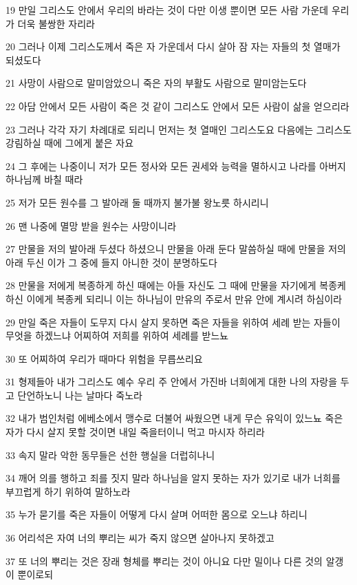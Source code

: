 \par 19 만일 그리스도 안에서 우리의 바라는 것이 다만 이생 뿐이면 모든 사람 가운데 우리가 더욱 불쌍한 자리라
\par 20 그러나 이제 그리스도께서 죽은 자 가운데서 다시 살아 잠 자는 자들의 첫 열매가 되셨도다
\par 21 사망이 사람으로 말미암았으니 죽은 자의 부활도 사람으로 말미암는도다
\par 22 아담 안에서 모든 사람이 죽은 것 같이 그리스도 안에서 모든 사람이 삶을 얻으리라
\par 23 그러나 각각 자기 차례대로 되리니 먼저는 첫 열매인 그리스도요 다음에는 그리스도 강림하실 때에 그에게 붙은 자요
\par 24 그 후에는 나중이니 저가 모든 정사와 모든 권세와 능력을 멸하시고 나라를 아버지 하나님께 바칠 때라
\par 25 저가 모든 원수를 그 발아래 둘 때까지 불가불 왕노릇 하시리니
\par 26 맨 나중에 멸망 받을 원수는 사망이니라
\par 27 만물을 저의 발아래 두셨다 하셨으니 만물을 아래 둔다 말씀하실 때에 만물을 저의 아래 두신 이가 그 중에 들지 아니한 것이 분명하도다
\par 28 만물을 저에게 복종하게 하신 때에는 아들 자신도 그 때에 만물을 자기에게 복종케 하신 이에게 복종케 되리니 이는 하나님이 만유의 주로서 만유 안에 계시려 하심이라
\par 29 만일 죽은 자들이 도무지 다시 살지 못하면 죽은 자들을 위하여 세례 받는 자들이 무엇을 하겠느냐 어찌하여 저희를 위하여 세례를 받느뇨
\par 30 또 어찌하여 우리가 때마다 위험을 무릅쓰리요
\par 31 형제들아 내가 그리스도 예수 우리 주 안에서 가진바 너희에게 대한 나의 자랑을 두고 단언하노니 나는 날마다 죽노라
\par 32 내가 범인처럼 에베소에서 맹수로 더불어 싸웠으면 내게 무슨 유익이 있느뇨 죽은 자가 다시 살지 못할 것이면 내일 죽을터이니 먹고 마시자 하리라
\par 33 속지 말라 악한 동무들은 선한 행실을 더럽히나니
\par 34 깨어 의를 행하고 죄를 짓지 말라 하나님을 알지 못하는 자가 있기로 내가 너희를 부끄럽게 하기 위하여 말하노라
\par 35 누가 묻기를 죽은 자들이 어떻게 다시 살며 어떠한 몸으로 오느냐 하리니
\par 36 어리석은 자여 너의 뿌리는 씨가 죽지 않으면 살아나지 못하겠고
\par 37 또 너의 뿌리는 것은 장래 형체를 뿌리는 것이 아니요 다만 밀이나 다른 것의 알갱이 뿐이로되
